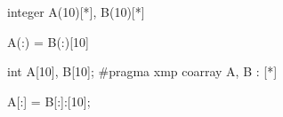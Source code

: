 \begin{minipage}{0.45\hsize}
\begin{center}
\begin{Fexample}
      integer A(10)[*], B(10)[*]


      A(:) = B(:)[10]
\end{Fexample}
\end{center}
\end{minipage}
%
\begin{minipage}{0.45\hsize}
\begin{center}
\begin{XCexampleR}
int A[10], B[10];
#pragma xmp coarray A, B : [*]

A[:] = B[:]:[10];
\end{XCexampleR}
\end{center}
\end{minipage}


%


%

